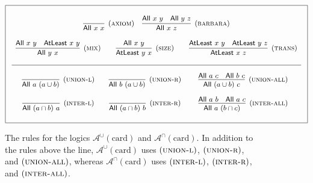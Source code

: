 \documentclass[letterpaper]{article} %
\theoremstyle{definition}
\newcommand{\rem}[1]{\relax}
\newcommand{\Aunion}{\mathscr{A}^{\cup}}
\newcommand{\Sunion}{\mathscr{S}^{\cup}}
\newcommand{\Ainter}{\mathscr{A}^{\cap}}
\newcommand{\proverule}{\textsc}
\newcommand{\axiom}{\proverule{axiom}}
\newcommand{\barbara}{\proverule{barbara}}
\newcommand{\unionl}{\proverule{union-l}}
\newcommand{\unionr}{\proverule{union-r}}
\newcommand{\unionall}{\proverule{union-all}}
\newcommand{\interl}{\proverule{inter-l}}
\newcommand{\interr}{\proverule{inter-r}}
\newcommand{\interall}{\proverule{inter-all}}
\newcommand{\mix}{\proverule{mix}}
\newcommand{\size}{\proverule{size}}
\newcommand{\trans}{\proverule{trans}}
\newcommand{\All}[2]{\mathsf{All}\,\,#1\,\,#2}
\newcommand{\Atleast}[2]{\mathsf{AtLeast}\,\,#1\,\,#2}
\newcommand{\card}{\mathrm{card}}
\begin{document}

\begin{figure*}[t!]
\begin{equation*}
\boxed{
\small
\begin{array}{c}
\begin{array}{ccc}
\\ 
\infer[(\axiom)]
    {\All{x}{x}}
    {} &
\infer[(\barbara)]
    {\All{x}{z}}
    {\All{x}{y} & \All{y}{z}}
\end{array}
\\ \\ 
\begin{array}{ccc}
\infer[(\mix)]
    {\All{y}{x}}
    {\All{x}{y} & \Atleast{x}{y}} &
\infer[(\size)]
    {\Atleast{y}{x}}
    {\All{x}{y}} &

\infer[(\trans)]
    {\Atleast{x}{z}}
    {\Atleast{x}{y} & \Atleast{y}{z}} \\ \\
    \hline \\
    
\infer[(\unionl)]
    {\All{a}{(a\cup b)}}
    {} &
    \infer[(\unionr)]
    {\All{b}{(a\cup b)}}
    {} &
\infer[(\unionall)]
    {\All{(a\cup b)}{c}}
    {\All{a}{c} & \All{b}{c}} \\ \\

\infer[(\interl)]
    {\All{(a\cap b)}{a}}
    {} &
\infer[(\interr)]
    {\All{(a\cap b)}{b}}
    {} &
\infer[(\interall)]
    {\All{a}{(b\cap c)}}
    {\All{a}{b} & \All{a}{c}} \\ \\
    
\end{array}
\end{array}
}
\end{equation*}
\caption{The rules for the logics $\Aunion(\card)$ and $\Ainter(\card)$.  
In addition to the rules above the line, $\Aunion(\card)$ uses $(\unionl)$, $(\unionr)$, and $(\unionall)$, whereas $\Ainter(\card)$ uses $(\interl)$, $(\interr)$, and $(\interall)$.
\rem{
Both $\Aunion(\card)$ and $\Ainter(\card)$ share (\axiom), (\barbara), (\mix), (\size), and (\trans).  $\Aunion(\card)$ additionally uses $(\unionl)$, $(\unionr)$, and $(\unionall)$, whereas $\Ainter(\card)$ uses $(\interl)$, $(\interr)$, and $(\interall)$.}
\label{fig-rules}}
\end{figure*}
\end{document}
